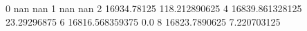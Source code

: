 0 nan nan
1 nan nan
2 16934.78125 118.212890625
4 16839.861328125 23.29296875
6 16816.568359375 0.0
8 16823.7890625 7.220703125
